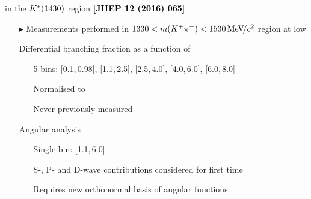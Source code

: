 \documentclass[aspectratio=1610]{beamer}
\def\Kstarfourteenthirty  {{\ensuremath{\kaon^{*}(1430)}}\xspace}
\begin{document}
\begin{frame}{\BdToKpimm in the \Kstarfourteenthirty region \hspace{0pt plus 1 filll} {\small \bf \textcolor{black}{[JHEP 12 (2016) 065]}}}
\begin{itemize}
\item[$\blacktriangleright$] Measurements performed in $1330<m({{K}^+}{{\pi}^-})<1530{\mathrm{\,Me\kern -0.1em V\!/}c^2}$ region at low \qsq
\item[]
\item[\ding{182}] Differential branching fraction as a function of \qsq
  \begin{itemize}
    \item[\ding{70}] 5 \qsq bins: [0.1,\,0.98], [1.1,\,2.5], [2.5,\,4.0], [4.0,\,6.0], [6.0,\,8.0]~\gevgevcccc
    \item[\ding{70}] Normalised to \BdToJPsiKstP
    \item[\ding{70}] Never previously measured
  \end{itemize}
\item[\ding{183}] Angular analysis
  \begin{itemize}
    \item[\ding{70}] Single \qsq bin: [1.1,\,6.0]~\gevgevcccc
    \item[\ding{70}] S-, P- and D-wave contributions considered for first time
    \item[\ding{70}] Requires new orthonormal basis of angular functions 
  \end{itemize}
  
\end{itemize}
\end{frame}
\end{document}
